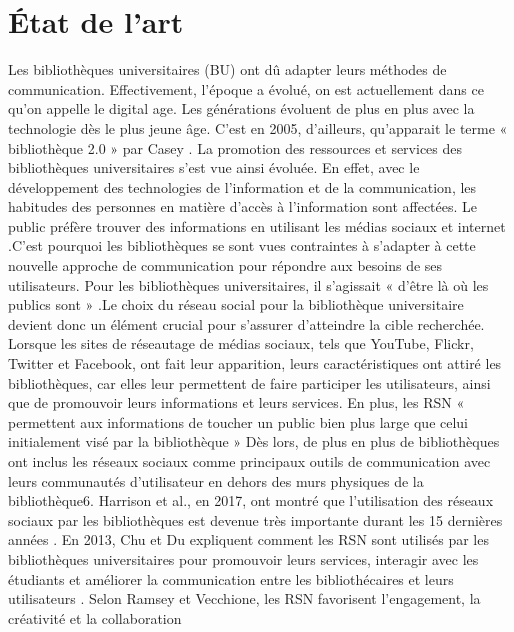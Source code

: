 \documentclass[a4paper,11pt]{article} %
\begin{document}
\section{État de l'art} %
Les bibliothèques universitaires (BU) ont dû adapter leurs méthodes de communication. 
Effectivement, l’époque a évolué, on est actuellement dans ce qu’on appelle le digital age. Les 
générations évoluent de plus en plus avec la technologie dès le plus jeune âge. C’est en 2005, 
d’ailleurs, qu’apparait le terme « bibliothèque 2.0 »  par Casey \citet{kouakou2015determinants,}.
La promotion des ressources et services des bibliothèques universitaires s’est vue ainsi évoluée. En effet, avec le développement des technologies de l’information et de la communication, les habitudes des personnes en matière d’accès à l’information sont affectées. Le public préfère trouver des informations en utilisant les médias sociaux et internet \citet{rahmawati2021academic,}.C’est pourquoi les bibliothèques se sont vues contraintes à s’adapter à cette 
nouvelle approche de communication pour répondre aux besoins de ses utilisateurs. Pour les 
bibliothèques universitaires, il s’agissait « d’être là où les publics sont » \citet{marois2012reseaux,}.Le choix du réseau 
social pour la bibliothèque universitaire devient donc un élément crucial pour s’assurer 
d’atteindre la cible recherchée.\\
Lorsque les sites de réseautage de médias sociaux, tels que YouTube, Flickr, Twitter et 
Facebook, ont fait leur apparition, leurs caractéristiques ont attiré les bibliothèques, car elles 
leur permettent de faire participer les utilisateurs, ainsi que de promouvoir leurs informations 
et leurs services. En plus, les RSN « permettent aux informations de toucher un public bien 
plus large que celui initialement visé par la bibliothèque » \citet{leclercq2011valorisation,} Dès lors, de plus en plus de 
bibliothèques ont inclus les réseaux sociaux comme principaux outils de communication avec 
leurs communautés d’utilisateur en dehors des murs physiques de la bibliothèque6. Harrison et 
al., en 2017, ont montré que l’utilisation des réseaux sociaux par les bibliothèques est devenue très importante durant les 15 dernières années \citet{harrison2017social,}. En 2013, Chu et Du expliquent comment les RSN 
sont utilisés par les bibliothèques universitaires pour promouvoir leurs services, interagir avec 
les étudiants et améliorer la communication entre les bibliothécaires et leurs utilisateurs \citet{chu2013social,}. Selon 
Ramsey et Vecchione, les RSN favorisent l’engagement, la créativité et la collaboration \citet{ramsey2014engageant,}
\end{document}
